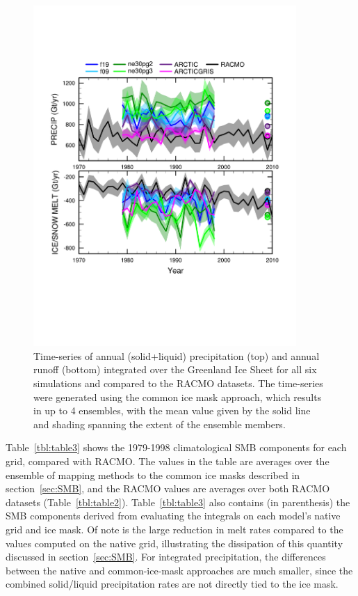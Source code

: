 \documentclass[draft]{agujournal2019}
\begin{document}
\begin{figure}[t]
\begin{center}
         \includegraphics[width=100mm]{figs/temp_tseries_GRIS.pdf}
\end{center}
\caption{Time-series of annual (solid+liquid) precipitation (top) and annual runoff (bottom) integrated over the Greenland Ice Sheet for all six simulations and compared to the RACMO datasets. The time-series were generated using the common ice mask approach, which results in up to 4 ensembles, with the mean value given by the solid line and shading spanning the extent of the ensemble members.}
\label{fig:tseries}
\end{figure}

Table~\ref{tbl:table3} shows the 1979-1998 climatological SMB components for each grid, compared with RACMO. The values in the table are averages over the ensemble of mapping methods to the common ice masks described in section~\ref{sec:SMB}, and the RACMO values are averages over both RACMO datasets (Table~\ref{tbl:table2}). Table~\ref{tbl:table3} also contains (in parenthesis) the SMB components derived from evaluating the integrals on each model's native grid and ice mask. Of note is the large reduction in melt rates compared to the values computed on the native grid, illustrating the dissipation of this quantity discussed in section~\ref{sec:SMB}. For integrated precipitation, the differences between the native and common-ice-mask approaches are much smaller, since the combined solid/liquid precipitation rates are not directly tied to the ice mask.
\end{document}
